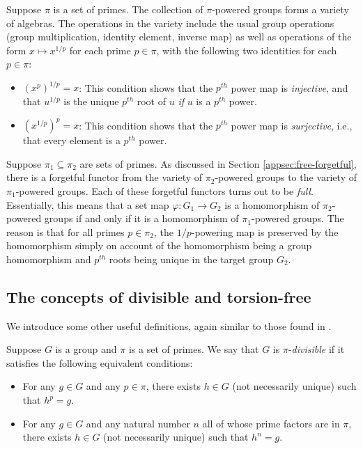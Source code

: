 \documentclass{ucetd}
\begin{document}
Suppose $\pi$ is a set of primes. The collection of $\pi$-powered
groups forms a variety of algebras. The operations in the variety
include the usual group operations (group multiplication, identity
element, inverse map) as well as operations of the form $x \mapsto
x^{1/p}$ for each prime $p \in \pi$, with the following two identities
for each $p \in \pi$:

\begin{itemize}
\item $(x^p)^{1/p} = x$: This condition shows that the $p^{th}$
  power map is {\em injective}, and that $u^{1/p}$ is the unique
  $p^{th}$ root of $u$ {\em if} $u$ is a $p^{th}$ power.
\item $(x^{1/p})^p = x$: This condition shows that the $p^{th}$ power
  map is {\em surjective}, i.e., that every element is a $p^{th}$
  power.
\end{itemize}

Suppose $\pi_1 \subseteq \pi_2$ are sets of primes. As discussed in
Section \ref{appsec:free-forgetful}, there is a forgetful functor from
the variety of $\pi_2$-powered groups to the variety of
$\pi_1$-powered groups. Each of these forgetful functors turns out to
be {\em full}. Essentially, this means that a set map $\varphi:G_1 \to
G_2$ is a homomorphism of $\pi_2$-powered groups if and only if it is
a homomorphism of $\pi_1$-powered groups. The reason is that for all
primes $p \in \pi_2$, the $1/p$-powering map is preserved by the
homomorphism simply on account of the homomorphism being a group
homomorphism and $p^{th}$ roots being unique in the target group
$G_2$.


\subsection{The concepts of divisible and torsion-free}\label{sec:divisible-and-torsion-free}

We introduce some other useful definitions, again similar to those
found in \cite{Khukhro}.

\begin{definer}
  Suppose $G$ is a group and $\pi$ is a set of primes. We say that $G$
  is $\pi$-{\em divisible} if it satisfies the following equivalent conditions:

  \begin{itemize}
  \item For any $g \in G$ and any $p \in \pi$, there exists $h \in G$
    (not necessarily unique) such that $h^p = g$.
  \item For any $g \in G$ and any natural number $n$ all of whose
    prime factors are in $\pi$, there exists $h \in G$ (not
    necessarily unique) such that $h^n = g$.
  \end{itemize}
\end{definer}
\end{document}
